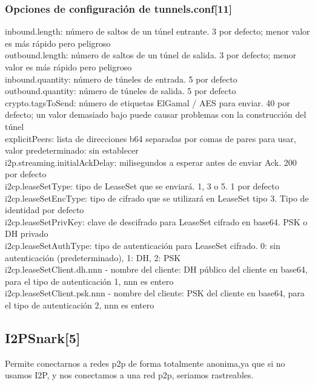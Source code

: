 \documentclass{article}
\begin{document}
\subsubsection{Opciones de configuración de tunnels.conf[11]}
inbound.length: número de saltos de un túnel entrante. 3 por defecto; menor valor es más rápido pero peligroso
\\

outbound.length: número de saltos de un túnel de salida. 3 por defecto; menor valor es más rápido pero peligroso
\\

inbound.quantity: número de túneles de entrada. 5 por defecto
\\

outbound.quantity: número de túneles de salida. 5 por defecto
\\

crypto.tagsToSend: número de etiquetas ElGamal / AES para enviar. 40 por defecto; un valor demasiado bajo puede causar problemas con la construcción del túnel
\\

explicitPeers: lista de direcciones b64 separadas por comas de pares para usar, valor predeterminado: sin establecer
\\

i2p.streaming.initialAckDelay: milisegundos a esperar antes de enviar Ack. 200 por defecto
\\

i2cp.leaseSetType: tipo de LeaseSet que se enviará. 1, 3 o 5. 1 por defecto
\\

i2cp.leaseSetEncType: tipo de cifrado que se utilizará en LeaseSet tipo 3. Tipo de identidad por defecto
\\

i2cp.leaseSetPrivKey: clave de descifrado para LeaseSet cifrado en base64. PSK o DH privado
\\

i2cp.leaseSetAuthType: tipo de autenticación para LeaseSet cifrado. 0: sin autenticación (predeterminado), 1: DH, 2: PSK
\\

i2cp.leaseSetClient.dh.nnn - nombre del cliente: DH público del cliente en base64, para el tipo de autenticación 1, nnn es entero
\\

i2cp.leaseSetClient.psk.nnn - nombre del cliente: PSK del cliente en base64, para el tipo de autenticación 2, nnn es entero 
\subsection{I2PSnark[5]}
Permite conectarnos a redes p2p de forma totalmente anonima,ya que si no usamos I2P, y nos conectamos a una red p2p, seriamos rastreables.
\\
\end{document}
